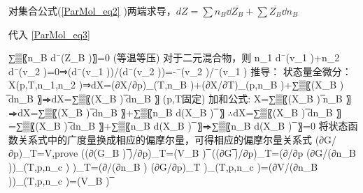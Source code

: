 对集合公式(\autoref{ParMol_eq2} )两端求导，$dZ=\sum n_B \dd {\overline {Z_B}} + \sum \overline {Z_B}  \dd n_B$

代入 \autoref{ParMol_eq3} 


	∑▒〖n_B d¯(Z_B )〗=0 (等温等压)
	对于二元混合物，则 n_1 d¯(v_1 )+n_2 d¯(v_2 )=0⇒(d¯(v_1 ))/(d¯(v_2 ))=-¯(v_2 )/¯(v_1 )
	推导：
	状态量全微分：X(p,T,n_1,n_2 )⇒dX=(∂X/∂p)_(T,n_B )+(∂X/∂T)_(p,n_B )+∑▒〖(X_B ) ̅dn_B 〗⇒dX=∑▒〖(X_B ) ̅dn_B 〗  (p,T固定)
	加和公式: X=∑▒〖(X_B ) ̅n_B 〗⇒dX=∑▒〖(X_B ) ̅dn_B 〗+∑▒〖n_B d(X_B ) ̅ 〗
	∴dX=∑▒〖(X_B ) ̅dn_B 〗=∑▒〖(X_B ) ̅dn_B 〗+∑▒〖n_B d(X_B ) ̅ 〗⇒∑▒〖n_B d(X_B ) ̅ 〗=0
	将状态函数关系式中的广度量换成相应的偏摩尔量，可得相应的偏摩尔量关系式
	(∂G/∂p)_T=V,prove ((∂(G_B ) ̅)/∂p)_T=(V_B ) ̅
	((∂G ̅)/∂p)_T=(∂/∂p (∂G/(∂n_B ))_(T,p,n_c ) )_T=(∂/(∂n_B ) (∂G/∂p)_T )_(T,p,n_c )=(∂V/(∂n_B ))_(T,p,n_c )=(V_B ) ̅
